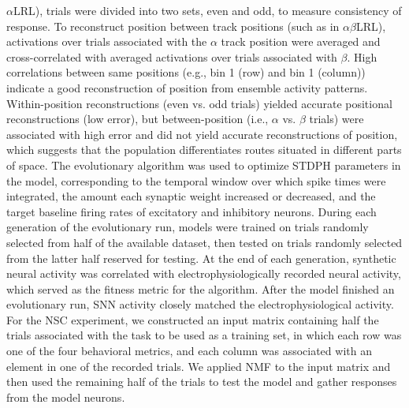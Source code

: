 $\alpha$LRL), trials were divided into two sets, even and odd, to measure consistency of response. To reconstruct position between track positions (such as in $\alpha$$\beta$LRL), activations over trials associated with the $\alpha$ track position were averaged and cross-correlated with averaged activations over trials associated with $\beta$. High correlations between same positions (e.g., bin 1 (row) and bin 1 (column)) indicate a good reconstruction of position from ensemble activity
patterns. Within-position reconstructions (even vs. odd trials) yielded accurate positional reconstructions (low error), but between-position (i.e., $\alpha$ vs. $\beta$ trials) were associated with high error and did not yield accurate reconstructions of position, which suggests that the population differentiates routes situated in different parts of space.
The evolutionary algorithm was used to optimize STDPH parameters in the model, corresponding to the temporal window over which spike times were integrated, the amount each synaptic weight increased or decreased, and the target baseline firing rates of excitatory and inhibitory neurons. During each generation of the evolutionary run, models were trained on trials randomly selected from half of the available dataset, then tested on trials randomly selected from the latter half reserved for testing. At the end of each generation, synthetic neural activity was correlated with electrophysiologically recorded neural activity, which served as the fitness metric for the algorithm. After the model finished an evolutionary run, SNN activity closely matched the electrophysiological activity. For the \ac{NSC} experiment, we constructed an input matrix containing half the trials associated with the task to be used as a training set, in which each row was one of the four behavioral metrics, and each column was associated with an element in one of the recorded trials. We applied \ac{NMF} to the input matrix and then used the remaining half of the trials to test the model and gather responses from the model neurons.

